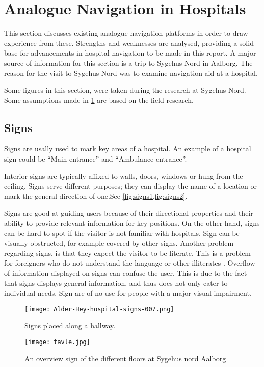 \section{Analogue Navigation in Hospitals} %
\label{sec:anal_nav}

This section discusses existing analogue navigation platforms in order to draw experience from these. Strengths and weaknesses are analysed, providing a solid base for advancements in hospital navigation to be made in this report. A major source of information for this section is a trip to Sygehus Nord in Aalborg. The reason for the visit to Sygehus Nord was to examine navigation aid at a hospital.

Some figures in this section, were taken during the research at Sygehus Nord. Some assumptions made in \cref{sec:anal_nav} are based on the field research.

\subsection{Signs} \label{sub:sign}
Signs are usally used to mark key areas of a hospital. An example of a hospital sign could be \enquote{Main entrance} and \enquote{Ambulance entrance}\cite{signs_hospital,art_Osborne}.

Interior signs are typically affixed to walls, doors, windows or hung from the ceiling. Signs serve different purposes; they can display the name of a location or mark the general direction of one.See \cref{fig:signs1,fig:signs2}.

Signs are good at guiding users because of their directional properties and their ability to provide relevant information for key positions. On the other hand, signs can be hard to spot if the visitor is not familiar with hospitals. Sign can be visually obstructed, for example covered by other signs. Another problem regarding signs, is that they expect the visitor to be literate. This is a problem for foreigners who do not understand the language or other illiterates \cite{signs_reading}. Overflow of information displayed on signs can confuse the user. This is due to the fact that signs displays general information, and thus does not only cater to individual needs. Sign are of no use for people with a major visual impairment.


\begin{figure}
\centering
  \begin{minipage}{0.45\textwidth}
    \centering
    \texttt{[image: Alder-Hey-hospital-signs-007.png]}
    \caption{Signs placed along a hallway. \cite{signs_hospital}} \label{fig:signs1}
  \end{minipage}
  \hfill
  \begin{minipage}{0.45\textwidth}
    \centering
    \texttt{[image: tavle.jpg]}
    \caption{An overview sign of the different floors at Sygehus nord Aalborg} \label{fig:signs2}
  \end{minipage}
  \end{figure}

